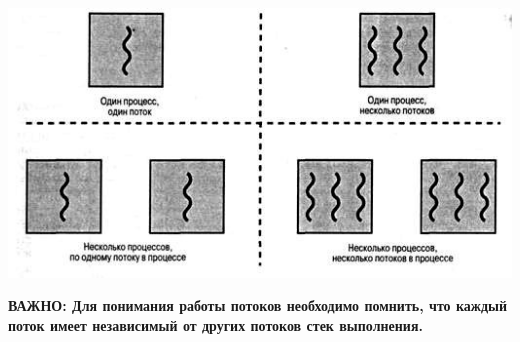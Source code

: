 \documentclass[a4paper]{article}
\begin{document}
\begin{center}
  \includegraphics[width = 15cm]{1.jpg}
\end{center}
\noindent
\bf ВАЖНО: \rm Для понимания работы потоков необходимо помнить, что каждый поток имеет независимый от других потоков стек выполнения.
\end{document}

